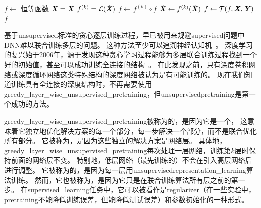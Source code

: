 \begin{algorithm}
\caption{ {\em \gls{greedy_layer_wise_unsupervised_pretraining}的协定}\\
给定如下：无监督特征学习算法$\CalL$，$\CalL$使用训练集样本并返回\gls{encoder}或特征函数$f$。
原始输入数据是$\MX$，每行一个样本，并且$f^{(1)}(\MX)$是第一阶段\gls{encoder}关于$\MX$的输出。
在执行\gls{fine_tune}的情况下，我们使用学习者$\CalT$，并使用初始函数$f$，输入样本$\MX$（以及在监督\gls{fine_tune}情况下关联的目标$\MY$），并返回细调好函数。 阶段数为$m$。
}
\label{alg:pretraining}
\begin{algorithmic}
\STATE $f \leftarrow$ 恒等函数
\STATE $\tilde{\boldsymbol{\mathit{X}}} = \boldsymbol{\mathit{X}}$
  \STATE $f^{(k)} = {\mathcal{L}}(\tilde{\boldsymbol{\mathit{X}}})$
  \STATE $f \leftarrow f^{(k)} \circ f$
  \STATE $\tilde{\boldsymbol{\mathit{X}}} \leftarrow f^{(k)}(\tilde{\boldsymbol{\mathit{X}}})$
\ENDFOR
{}
  \STATE $f \leftarrow {\mathcal{T}}(f,\boldsymbol{\mathit{X}},\boldsymbol{\mathit{Y}})$
\ENDIF
{} $f$
\end{algorithmic}
\end{algorithm}


基于\gls{unsupervised}标准的贪心逐层训练过程，早已被用来规避\gls{supervised}问题中\gls{DNN}难以联合训练多层的问题。
这种方法至少可以追溯神经认知机~\citep{Fukushima75}。
深度学习的复兴始于2006年，源于发现这种贪心学习过程能够为多层联合训练过程找到一个好的初始值，甚至可以成功训练全连接的结构~\citep{Hinton06-small,Hinton-Science2006,HintonG2006,Bengio-nips-2006,ranzato-07-small}。
在此发现之前，只有深度卷积网络或深度循环网络这类特殊结构的深度网络被认为是有可能训练的。
现在我们知道训练具有全连接的深度结构时，不再需要使用\gls{greedy_layer_wise_unsupervised_pretraining}，但\gls{unsupervised}\gls{pretraining}是第一个成功的方法。


\gls{greedy_layer_wise_unsupervised_pretraining}被称为的，是因为它是一个，
这意味着它独立地优化解决方案的每一个部分，每一步解决一个部分，而不是联合优化所有部分。
它被称为，是因为这些独立的解决方案是网络层。
具体地，\gls{greedy_layer_wise_unsupervised_pretraining}每次处理一层网络，训练第$k$层时保持前面的网络层不变。
特别地，低层网络（最先训练的）不会在引入高层网络后进行调整。
它被称为的，是因为每一层用\gls{unsupervised}\gls{representation_learning}算法训练。
然而，它也被称为，是因为它只是在联合训练算法所有层之前的第一步。
在\gls{supervised_learning}任务中，它可以被看作是\gls{regularizer}（在一些实验中，\gls{pretraining}不能降低训练误差，但能降低测试误差）和参数初始化的一种形式。

